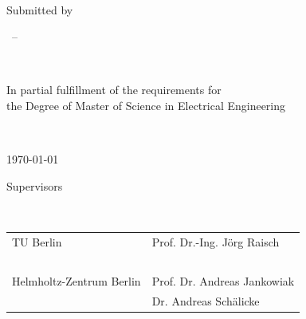 \begin{titlingpage}
	\vfill

	\begin{center}
	\LARGE \textsc{\thesubject}
	\end{center}
	
	~
	
	\begin{Spacing}{3}
		\centering\textsc{\huge\thetitle}
	\end{Spacing}
	
	\vfill
	
	\centering	
	Submitted by
	

	\theauthor  ~-- \theauthorinfo

	~
	
	In partial fulfillment of the requirements for \\ the Degree of Master of Science in Electrical Engineering

	~
	
	
	\today		
	
	\vfill		


	Supervisors
	
	~
	
	\setlength{\tabcolsep}{15pt}
    \renewcommand\arraystretch{.7}
	\begin{tabular}{l l}
		TU Berlin
		&Prof. Dr.-Ing. Jörg Raisch \\
	    ~ & ~\\
			Helmholtz-Zentrum Berlin 
		& Prof. Dr. Andreas Jankowiak \\
		~ & Dr. Andreas Schälicke
	\end{tabular}
\end{titlingpage}